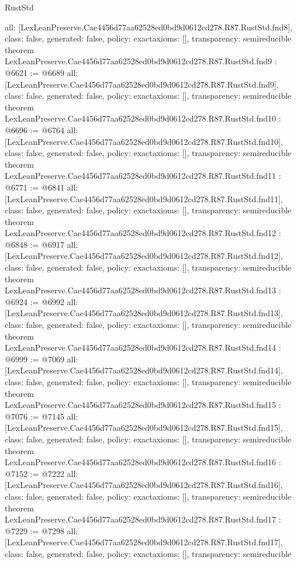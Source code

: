 \begin{lexlean}{RustStd}
\begin{coremodule}
{  all: [LexLeanPreserve.Cae4456d77aa62528ed0bd9d0612cd278.R87.RustStd.fnd8],
  class: false,
  generated: false,
  policy: exact{axioms: []},
  transparency: semireducible
}
theorem LexLeanPreserve.Cae4456d77aa62528ed0bd9d0612cd278.R87.RustStd.fnd9 : @6621 := @6689 {
  all: [LexLeanPreserve.Cae4456d77aa62528ed0bd9d0612cd278.R87.RustStd.fnd9],
  class: false,
  generated: false,
  policy: exact{axioms: []},
  transparency: semireducible
}
theorem LexLeanPreserve.Cae4456d77aa62528ed0bd9d0612cd278.R87.RustStd.fnd10 : @6696 := @6764 {
  all: [LexLeanPreserve.Cae4456d77aa62528ed0bd9d0612cd278.R87.RustStd.fnd10],
  class: false,
  generated: false,
  policy: exact{axioms: []},
  transparency: semireducible
}
theorem LexLeanPreserve.Cae4456d77aa62528ed0bd9d0612cd278.R87.RustStd.fnd11 : @6771 := @6841 {
  all: [LexLeanPreserve.Cae4456d77aa62528ed0bd9d0612cd278.R87.RustStd.fnd11],
  class: false,
  generated: false,
  policy: exact{axioms: []},
  transparency: semireducible
}
theorem LexLeanPreserve.Cae4456d77aa62528ed0bd9d0612cd278.R87.RustStd.fnd12 : @6848 := @6917 {
  all: [LexLeanPreserve.Cae4456d77aa62528ed0bd9d0612cd278.R87.RustStd.fnd12],
  class: false,
  generated: false,
  policy: exact{axioms: []},
  transparency: semireducible
}
theorem LexLeanPreserve.Cae4456d77aa62528ed0bd9d0612cd278.R87.RustStd.fnd13 : @6924 := @6992 {
  all: [LexLeanPreserve.Cae4456d77aa62528ed0bd9d0612cd278.R87.RustStd.fnd13],
  class: false,
  generated: false,
  policy: exact{axioms: []},
  transparency: semireducible
}
theorem LexLeanPreserve.Cae4456d77aa62528ed0bd9d0612cd278.R87.RustStd.fnd14 : @6999 := @7069 {
  all: [LexLeanPreserve.Cae4456d77aa62528ed0bd9d0612cd278.R87.RustStd.fnd14],
  class: false,
  generated: false,
  policy: exact{axioms: []},
  transparency: semireducible
}
theorem LexLeanPreserve.Cae4456d77aa62528ed0bd9d0612cd278.R87.RustStd.fnd15 : @7076 := @7145 {
  all: [LexLeanPreserve.Cae4456d77aa62528ed0bd9d0612cd278.R87.RustStd.fnd15],
  class: false,
  generated: false,
  policy: exact{axioms: []},
  transparency: semireducible
}
theorem LexLeanPreserve.Cae4456d77aa62528ed0bd9d0612cd278.R87.RustStd.fnd16 : @7152 := @7222 {
  all: [LexLeanPreserve.Cae4456d77aa62528ed0bd9d0612cd278.R87.RustStd.fnd16],
  class: false,
  generated: false,
  policy: exact{axioms: []},
  transparency: semireducible
}
theorem LexLeanPreserve.Cae4456d77aa62528ed0bd9d0612cd278.R87.RustStd.fnd17 : @7229 := @7298 {
  all: [LexLeanPreserve.Cae4456d77aa62528ed0bd9d0612cd278.R87.RustStd.fnd17],
  class: false,
  generated: false,
  policy: exact{axioms: []},
  transparency: semireducible
}
\end{coremodule}
\end{lexlean}
